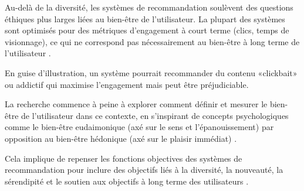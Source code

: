 Au-delà de la diversité, les systèmes de recommandation soulèvent des questions éthiques plus larges liées au bien-être de l'utilisateur. La plupart des systèmes sont optimisés pour des métriques d'engagement à court terme (clics, temps de visionnage), ce qui ne correspond pas nécessairement au bien-être à long terme de l'utilisateur \citet{Ekstrand2021}.

En guise d'illustration, un système pourrait recommander du contenu «clickbait» ou addictif qui maximise l'engagement mais peut être préjudiciable. 

La recherche commence à peine à explorer comment définir et mesurer le bien-être de l'utilisateur dans ce contexte, en s'inspirant de concepts psychologiques comme le bien-être eudaimonique (axé sur le sens et l'épanouissement) par opposition au bien-être hédonique (axé sur le plaisir immédiat) \citep{Ryan2001, Huta2013}. 

Cela implique de repenser les fonctions objectives des systèmes de recommandation pour inclure des objectifs liés à la diversité, la nouveauté, la sérendipité et le soutien aux objectifs à long terme des utilisateurs \citet{McNee2006}.
